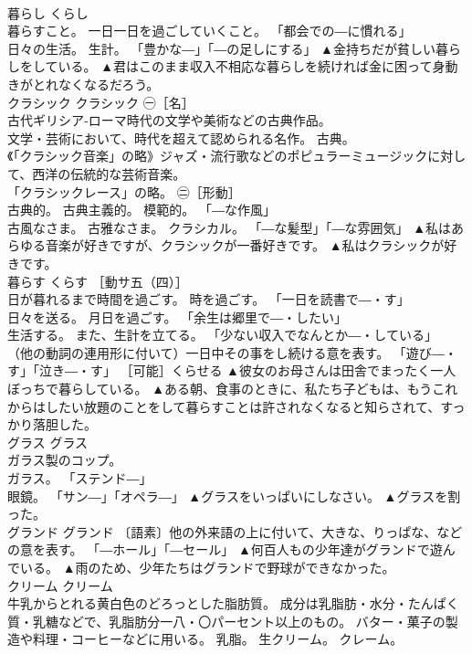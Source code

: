 \documentclass[8pt]{extreport}
\begin{document}
\begin{CJK}{UTF8}{min}
\\	暮らし	くらし	
\\	暮らすこと。 一日一日を過ごしていくこと。 「都会での―に慣れる」 
\\	日々の生活。 生計。 「豊かな―」「―の足しにする」	▲金持ちだが貧しい暮らしをしている。 ▲君はこのまま収入不相応な暮らしを続ければ金に困って身動きがとれなくなるだろう。
\\	クラシック	クラシック	㊀［名］ 
\\	古代ギリシア‐ローマ時代の文学や美術などの古典作品。 
\\	文学・芸術において、時代を超えて認められる名作。 古典。 
\\	《「クラシック音楽」の略》ジャズ・流行歌などのポピュラーミュージックに対して、西洋の伝統的な芸術音楽。 
\\	「クラシックレース」の略。 ㊁［形動］ 
\\	古典的。 古典主義的。 模範的。 「―な作風」 
\\	古風なさま。 古雅なさま。 クラシカル。 「―な髪型」「―な雰囲気」	▲私はあらゆる音楽が好きですが、クラシックが一番好きです。 ▲私はクラシックが好きです。
\\	暮らす	くらす	［動サ五（四）］ 
\\	日が暮れるまで時間を過ごす。 時を過ごす。 「一日を読書で―・す」 
\\	日々を送る。 月日を過ごす。 「余生は郷里で―・したい」 
\\	生活する。 また、生計を立てる。 「少ない収入でなんとか―・している」 
\\	（他の動詞の連用形に付いて）一日中その事をし続ける意を表す。 「遊び―・す」「泣き―・す」 ［可能］くらせる	▲彼女のお母さんは田舎でまったく一人ぼっちで暮らしている。 ▲ある朝、食事のときに、私たち子どもは、もうこれからはしたい放題のことをして暮らすことは許されなくなると知らされて、すっかり落胆した。
\\	グラス	グラス	
\\	ガラス製のコップ。 
\\	ガラス。 「ステンド―」 
\\	眼鏡。 「サン―」「オペラ―」	▲グラスをいっぱいにしなさい。 ▲グラスを割った。
\\	グランド	グランド	〔語素〕他の外来語の上に付いて、大きな、りっぱな、などの意を表す。 「―ホール」「―セール」	▲何百人もの少年達がグランドで遊んでいる。 ▲雨のため、少年たちはグランドで野球ができなかった。
\\	クリーム	クリーム	
\\	牛乳からとれる黄白色のどろっとした脂肪質。 成分は乳脂肪・水分・たんぱく質・乳糖などで、乳脂肪分一八・〇パーセント以上のもの。 バター・菓子の製造や料理・コーヒーなどに用いる。 乳脂。 生クリーム。 クレーム。 

\end{CJK}
\end{document}
